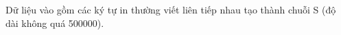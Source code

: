Dữ liệu vào gồm các ký tự in thường viết liên tiếp nhau tạo thành chuỗi S (độ dài không quá 500000).